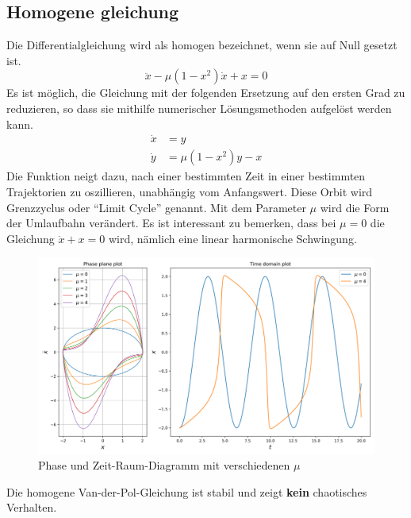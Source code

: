 \subsection{Homogene gleichung
\label{vanderpol:subsection:homogene}}
Die Differentialgleichung wird als homogen bezeichnet, wenn sie auf Null gesetzt ist.
\begin{equation}
	\ddot{x} - \mu \left(1-x^{2}\right)\dot{x}+x = 0
\label{vanderpol:equations:homogene}
\end{equation}
Es ist möglich, die Gleichung mit der folgenden Ersetzung auf den ersten Grad zu reduzieren, so dass sie mithilfe numerischer Lösungsmethoden aufgelöst werden kann.
\begin{align}
	\dot{x} &= y  \label{vanderpol:equations:homogene_1} \\
	\dot{y} &= \mu \left(1-x^{2}\right)y - x 
	\label{vanderpol:equations:homogene_2}
\end{align}
Die Funktion neigt dazu, nach einer bestimmten Zeit in einer bestimmten Trajektorien zu oszillieren, unabhängig vom Anfangswert. Diese Orbit wird Grenzzyclus oder ``Limit Cycle'' genannt. Mit dem Parameter $\mu$ wird die Form der Umlaufbahn verändert. Es ist interessant zu bemerken, dass bei $\mu = 0$ die Gleichung $\ddot{x} + x = 0$ wird, nämlich eine linear harmonische Schwingung.
\begin{figure}[ht]
	\centering
	\includegraphics[width=\textwidth]{papers/vanderpol/figures/homogene_plot.png}
	\caption{Phase und Zeit-Raum-Diagramm mit verschiedenen $\mu$\label{vanderpol:figures:homogene}}
\end{figure}

\noindent Die homogene Van-der-Pol-Gleichung ist stabil und zeigt \textbf{kein} chaotisches Verhalten.
